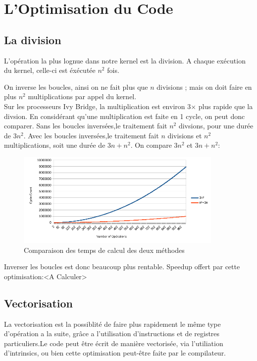 
\chapter*{L'Optimisation du Code}
\section*{La division}

L'opération la plus lognue dans notre kernel est la division. A chaque exécution du kernel, celle-ci est éxécutée $n^2$ fois.

On inverse les boucles, ainsi on ne fait plus que $n$ divisions ; mais on doit faire en plus $n^2$ multiplications par appel du kernel.
\\Sur les processeurs Ivy Bridge, la multiplication est environ 3$\times$ plus rapide que la divsion. En considérant qu'une multiplication est faite en 1 cycle, on peut donc comparer.
Sans les boucles inversées,le traitement fait $n^2$ divsions, pour une durée de $3n^2$.
Avec les boucles inversées,le traitement fait $n$ divisions et $n^2$ multiplications, soit une durée de $3n+n^2$.
On compare $3n^2$ et $3n+n^2$:\\
\begin{figure}[ht!]
    \centering
    \includegraphics[width=100mm]{MEDIA/div_vs_mult_graph.png}
    \caption{Comparaison des temps de calcul des deux méthodes}
\end{figure}
Inverser les boucles est donc beaucoup plus rentable.
Speedup offert par cette optimisation:<A Calculer>

\section*{Vectorisation}

La vectorisation est la possiblité de faire plus rapidement le même type d'opération a la suite, grâce a l'utilisation d'instructions et de registres particuliers.Le code peut être écrit de manière vectorisée, via l'utiliation d'intrinsics, ou bien cette optimisation peut-être faite par le compilateur.

